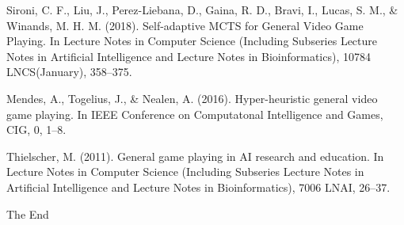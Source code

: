 \documentclass{beamer}
\begin{document}
\begin{frame}[allowframebreaks]
{\begin{thebibliography}{99}
      Sironi, C. F., Liu, J., Perez-Liebana, D., Gaina, R. D., Bravi, I., Lucas, S. M., \& Winands, M. H. M. (2018).
      \newblock Self-adaptive MCTS for General Video Game Playing.
      \newblock In Lecture Notes in Computer Science (Including Subseries Lecture Notes in Artificial Intelligence and Lecture Notes in Bioinformatics), 10784 LNCS(January), 358–375.

      Mendes, A., Togelius, J., \& Nealen, A. (2016).
      \newblock Hyper-heuristic general video game playing.
      \newblock In IEEE Conference on Computatonal Intelligence and Games, CIG, 0, 1–8.

      Thielscher, M. (2011).
      \newblock General game playing in AI research and education.
      \newblock In Lecture Notes in Computer Science (Including Subseries Lecture Notes in Artificial Intelligence and Lecture Notes in Bioinformatics), 7006 LNAI, 26–37.

    \end{thebibliography}
  }
\end{frame}


\begin{frame}
  \Huge{\centerline{The End}}
\end{frame}

\end{document}
